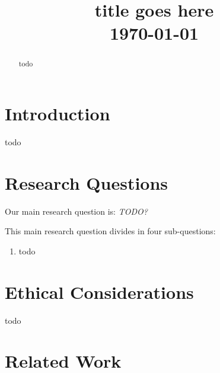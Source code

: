 \documentclass[conference]{IEEEtran}
\begin{document}
\title{title goes here \\\vspace{5mm} \large  \today}
\author{
\and
{}
}
\maketitle
\thispagestyle{plain}
\pagestyle{plain}

\begin{abstract}

    todo

\end{abstract}

\section{Introduction}

todo


\section{Research Questions}\label{sec:researchq}

Our main research question is:
{\it TODO?}

\vspace{0.1cm}

\noindent{} This main research question divides in four sub-questions:

\begin{enumerate}
    \item todo
\end{enumerate}


\section{Ethical Considerations}\label{sec:ethics}

todo


\section{Related Work}\label{sec:relwork}
\end{document}
